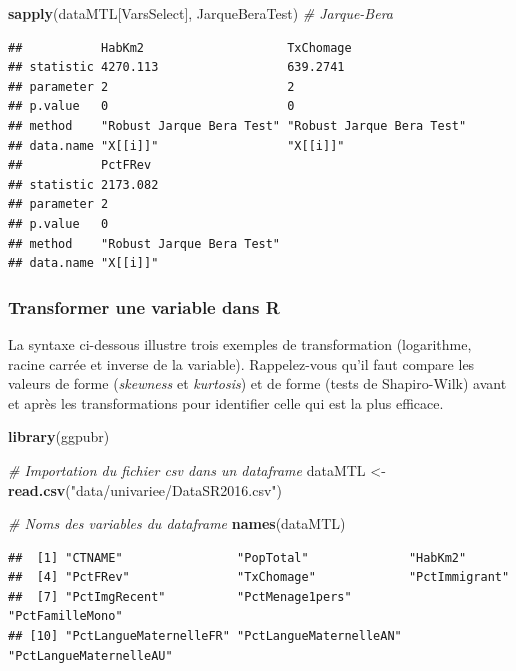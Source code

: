 \documentclass[
  11pt,
  french,
]{book}
\makeatletter
\newenvironment{Shaded}{\begin{snugshade}}{\end{snugshade}}
\newcommand{\CommentTok}[1]{\textcolor[rgb]{0.56,0.35,0.01}{\textit{#1}}}
\newcommand{\KeywordTok}[1]{\textcolor[rgb]{0.13,0.29,0.53}{\textbf{#1}}}
\newcommand{\NormalTok}[1]{#1}
\newcommand{\StringTok}[1]{\textcolor[rgb]{0.31,0.60,0.02}{#1}}
\newenvironment{kframe}{%
\medskip{}
\setlength{\fboxsep}{.8em}
 \def\at@end@of@kframe{}%
 \ifinner\ifhmode%
  \def\at@end@of@kframe{\end{minipage}}%
  \begin{minipage}{\columnwidth}%
 \fi\fi%
 \def\FrameCommand##1{\hskip\@totalleftmargin \hskip-\fboxsep
 \colorbox{shadecolor}{##1}\hskip-\fboxsep
     \hskip-\linewidth \hskip-\@totalleftmargin \hskip\columnwidth}%
 \MakeFramed {\advance\hsize-\width
   \@totalleftmargin\z@ \linewidth\hsize
   \@setminipage}}%
 {\par\unskip\endMakeFramed%
 \at@end@of@kframe}
\renewenvironment{Shaded}{\begin{kframe}}{\end{kframe}}
\makeatother
\begin{document}
\begin{Shaded}
\begin{Highlighting}[]
\KeywordTok{sapply}\NormalTok{(dataMTL[VarsSelect], JarqueBeraTest)    }\CommentTok{# Jarque-Bera}
\end{Highlighting}
\end{Shaded}

\begin{verbatim}
##           HabKm2                    TxChomage                
## statistic 4270.113                  639.2741                 
## parameter 2                         2                        
## p.value   0                         0                        
## method    "Robust Jarque Bera Test" "Robust Jarque Bera Test"
## data.name "X[[i]]"                  "X[[i]]"                 
##           PctFRev                  
## statistic 2173.082                 
## parameter 2                        
## p.value   0                        
## method    "Robust Jarque Bera Test"
## data.name "X[[i]]"
\end{verbatim}

\hypertarget{sect02563}{%
\subsubsection{Transformer une variable dans R}\label{sect02563}}

La syntaxe ci-dessous illustre trois exemples de transformation (logarithme, racine carrée et inverse de la variable). Rappelez-vous qu'il faut compare les valeurs de forme (\emph{skewness} et \emph{kurtosis}) et de forme (tests de Shapiro-Wilk) avant et après les transformations pour identifier celle qui est la plus efficace.

\begin{Shaded}
\begin{Highlighting}[]
\KeywordTok{library}\NormalTok{(ggpubr)}

\CommentTok{# Importation du fichier csv dans un dataframe}
\NormalTok{dataMTL <-}\StringTok{ }\KeywordTok{read.csv}\NormalTok{(}\StringTok{"data/univariee/DataSR2016.csv"}\NormalTok{)}

\CommentTok{# Noms des variables du dataframe}
\KeywordTok{names}\NormalTok{(dataMTL)}
\end{Highlighting}
\end{Shaded}

\begin{verbatim}
##  [1] "CTNAME"                "PopTotal"              "HabKm2"               
##  [4] "PctFRev"               "TxChomage"             "PctImmigrant"         
##  [7] "PctImgRecent"          "PctMenage1pers"        "PctFamilleMono"       
## [10] "PctLangueMaternelleFR" "PctLangueMaternelleAN" "PctLangueMaternelleAU"
\end{verbatim}
\end{document}
